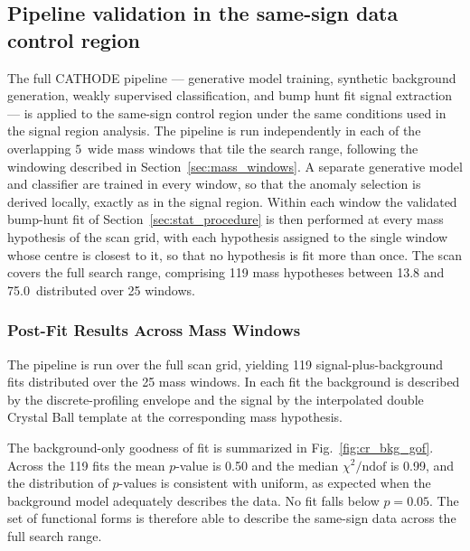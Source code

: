 \subsection{Pipeline validation in the same-sign data control region}
\label{sec:cr_pipeline_validation}

The full CATHODE pipeline --- generative model training, synthetic background generation, weakly supervised classification, and bump hunt fit signal extraction --- is applied to the same-sign control region under the same conditions used in the signal region analysis.
The pipeline is run independently in each of the overlapping $5$\GeV\ wide mass windows that tile the search range, following the windowing described in Section~\ref{sec:mass_windows}.
A separate generative model and classifier are trained in every window, so that the anomaly selection is derived locally, exactly as in the signal region.
Within each window the validated bump-hunt fit of Section~\ref{sec:stat_procedure} is then performed at every mass hypothesis of the scan grid, with each hypothesis assigned to the single window whose centre is closest to it, so that no hypothesis is fit more than once.
The scan covers the full search range, comprising 119 mass hypotheses between 13.8 and 75.0\GeV\ distributed over 25 windows.

\newpage
\subsubsection{Post-Fit Results Across Mass Windows}
\label{sec:cr_postfit_results}

The pipeline is run over the full scan grid, yielding 119 signal-plus-background fits distributed over the 25 mass windows.
In each fit the background is described by the discrete-profiling envelope and the signal by the interpolated double Crystal Ball template at the corresponding mass hypothesis.

The background-only goodness of fit is summarized in Fig.~\ref{fig:cr_bkg_gof}.
Across the 119 fits the mean $p$-value is 0.50 and the median $\chi^2/\mathrm{ndof}$ is 0.99, and the distribution of $p$-values is consistent with uniform, as expected when the background model adequately describes the data.
No fit falls below $p=0.05$.
The set of functional forms is therefore able to describe the same-sign data across the full search range.


